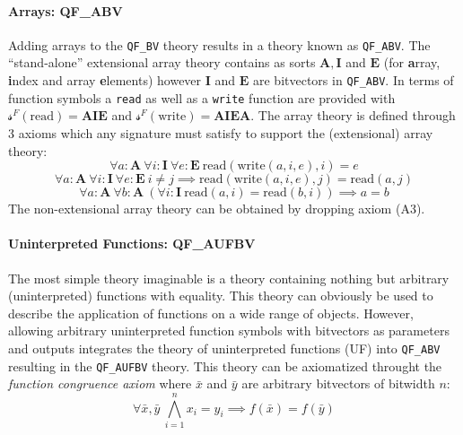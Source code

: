 \paragraph{Arrays: QF\_ABV}
Adding arrays to the \texttt{QF\_BV} theory results in a theory known as \mbox{\texttt{QF\_ABV}}. The \enquote{stand-alone} extensional array theory contains as sorts $\mathbf{A},\mathbf{I}$ and $\mathbf{E}$ (for \textbf{a}rray, \textbf{i}ndex and array \textbf{e}lements) however $\mathbf{I}$ and $\mathbf{E}$ are bitvectors in \texttt{QF\_ABV}. In terms of function symbols a \texttt{read} as well as a \texttt{write} function are provided with $\mathcal{s}^F(\text{read})=\mathbf{A}\mathbf{I}\mathbf{E}$ and $\mathcal{s}^F(\text{write})=\mathbf{A}\mathbf{I}\mathbf{E}\mathbf{A}$.
The array theory is defined through 3 axioms which any signature must satisfy to support the (extensional) array theory:
\begin{equation}
    \tag{A1}
    \label{eq:preliminaries:smt:a1}
    \forall a\colon\!\textbf{A}\ \forall i\colon\!\textbf{I}\ \forall e\colon\!\textbf{E}\ 
    \text{read}\left(\text{write}\left(a,i,e\right), i\right) = e
\end{equation}
\begin{equation}
    \tag{A2}
    \label{eq:preliminaries:smt:a2}
    \forall a\colon\!\textbf{A}\ \forall i\colon\!\textbf{I}\ \forall e\colon\!\textbf{E}\ 
    i \neq j \implies \text{read}\left(\text{write}\left(a,i,e\right), j\right)
    = \text{read}\left(a,j\right)
\end{equation}
\begin{equation}
    \tag{A3}
    \label{eq:preliminaries:smt:a3}
    \forall a\colon\!\textbf{A}\ \forall b\colon\!\textbf{A}\ 
    \left( \forall i\colon\!\textbf{I}\ \text{read}\left(a,i\right) = \text{read}\left(b,i\right) \right)
    \implies
    a=b
\end{equation}
The non-extensional array theory can be obtained by dropping axiom (A3).

\paragraph{Uninterpreted Functions: QF\_AUFBV}
The most simple theory imaginable is a theory containing nothing but arbitrary (uninterpreted) functions with equality. This theory can obviously be used to describe the application of functions on a wide range of objects. However, allowing arbitrary uninterpreted function symbols with bitvectors as parameters and outputs integrates the theory of uninterpreted functions (UF) into \texttt{QF\_ABV} resulting in the \texttt{QF\_AUFBV} theory.
This theory can be axiomatized throught the \textit{function congruence axiom} \cite{PreinerNiemetzBiere-DIFTS13} where $\bar{x}$ and $\bar{y}$ are arbitrary bitvectors of bitwidth $n$:
\begin{equation}
    \tag{EUF}
    \label{eq:preliminaries:smt:euf}
    \forall \bar{x},\bar{y}\ \bigwedge\limits_{i=1}^n x_i=y_i \implies f\left(\bar{x}\right) = f\left(\bar{y}\right)
\end{equation}



